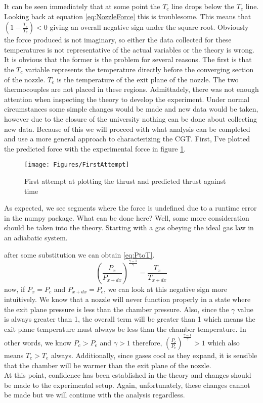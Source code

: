 It can be seen immediately that at some point the $T_c$ line drops below the $T_e$ line. Looking back at equation \ref{eq:NozzleForce} this is troublesome. This means that $\left(1-\frac{T_e}{T_c}\right)<0$ giving an overall negative sign under the square root. Obviously the force produced is not imaginary, so either the data collected for these temperatures is not representative of the actual variables or the theory is wrong. It is obvious that the former is the problem for several reasons. The first is that the $T_c$ variable represents the temperature directly before the converging section of the nozzle. $T_e$ is the temperature of the exit plane of the nozzle. The two thermocouples are not placed in these regions. Admittadely, there was not enough attention when inspecting the theory to develop the experiment. Under normal circumstances some simple changes would be made and new data would be taken, however due to the closure of the university nothing can be done about collecting new data. Because of this we will proceed with what analysis can be completed and use a more general approach to characterizing the CGT. First, I've plotted the predicted force with the experimental force in figure \ref{fig:FirstThrust}. 
\begin{figure}[h!]
\centering
\texttt{[image: Figures/FirstAttempt]}
\caption{First attempt at plotting the thrust and predicted thrust against time}
\label{fig:FirstThrust}
\end{figure}
As expected, we see segments where the force is undefined due to a runtime error in the numpy package. What can be done here? Well, some more consideration should be taken into the theory. Starting with a gas obeying the ideal gas law in an adiabatic system.

after some substitution we can obtain \ref{eq:PtoT}.
\begin{equation}\label{eq:PtoT}
\left(\frac{P_x}{P_{x+dx}}\right)^{\frac{\gamma-1}{\gamma}}=\frac{T_x}{T_{x+dx}}
\end{equation}
now, if $P_x=P_c$ and $P_{x+dx}=P_e$, we can look at this negative sign more intuitively. We know that a nozzle will never function properly in a state where the exit plane pressure is less than the chamber pressure. Also, since the $\gamma$ value is always greater than 1, the overall term will be greater than 1 which means the exit plane temperature must always be less than the chamber temperature. In other words, we know $P_c>P_e$ and $\gamma>1$ therefore, $\left(\frac{P_c}{P_e}\right)^{\frac{\gamma-1}{\gamma}}>1$ which also means $T_c>T_e$ always. Additionally, since gases cool as they expand, it is sensible that the chamber will be warmer than the exit plane of the nozzle.\\
At this point, confidence has been established in the theory and changes should be made to the experimental setup. Again, unfortunately, these changes cannot be made but we will continue with the analysis regardless.
